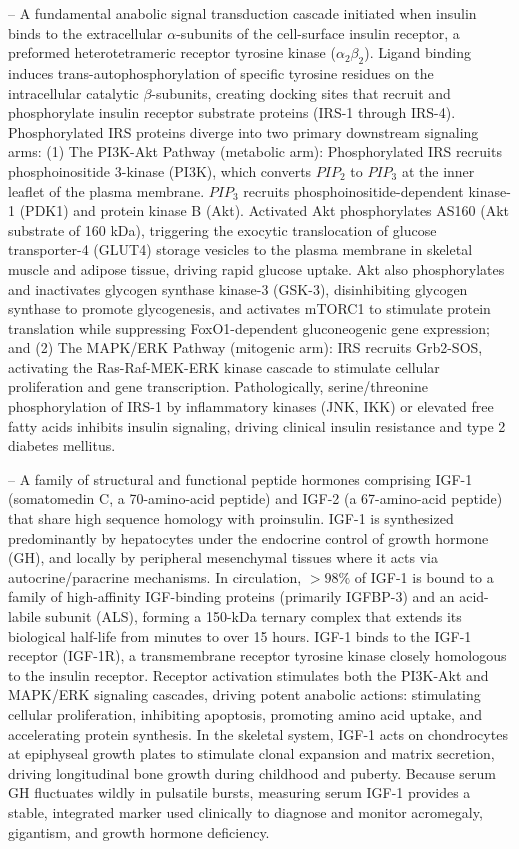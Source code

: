 -- A fundamental anabolic signal transduction cascade initiated when insulin binds to the extracellular $\alpha$-subunits of the cell-surface insulin receptor, a preformed heterotetrameric receptor tyrosine kinase ($\alpha_2\beta_2$). Ligand binding induces trans-autophosphorylation of specific tyrosine residues on the intracellular catalytic $\beta$-subunits, creating docking sites that recruit and phosphorylate insulin receptor substrate proteins (IRS-1 through IRS-4). Phosphorylated IRS proteins diverge into two primary downstream signaling arms: (1) The PI3K-Akt Pathway (metabolic arm): Phosphorylated IRS recruits phosphoinositide 3-kinase (PI3K), which converts $PIP_2$ to $PIP_3$ at the inner leaflet of the plasma membrane. $PIP_3$ recruits phosphoinositide-dependent kinase-1 (PDK1) and protein kinase B (Akt). Activated Akt phosphorylates AS160 (Akt substrate of 160 kDa), triggering the exocytic translocation of glucose transporter-4 (GLUT4) storage vesicles to the plasma membrane in skeletal muscle and adipose tissue, driving rapid glucose uptake. Akt also phosphorylates and inactivates glycogen synthase kinase-3 (GSK-3), disinhibiting glycogen synthase to promote glycogenesis, and activates mTORC1 to stimulate protein translation while suppressing FoxO1-dependent gluconeogenic gene expression; and (2) The MAPK/ERK Pathway (mitogenic arm): IRS recruits Grb2-SOS, activating the Ras-Raf-MEK-ERK kinase cascade to stimulate cellular proliferation and gene transcription. Pathologically, serine/threonine phosphorylation of IRS-1 by inflammatory kinases (JNK, IKK) or elevated free fatty acids inhibits insulin signaling, driving clinical insulin resistance and type 2 diabetes mellitus.

-- A family of structural and functional peptide hormones comprising IGF-1 (somatomedin C, a 70-amino-acid peptide) and IGF-2 (a 67-amino-acid peptide) that share high sequence homology with proinsulin. IGF-1 is synthesized predominantly by hepatocytes under the endocrine control of growth hormone (GH), and locally by peripheral mesenchymal tissues where it acts via autocrine/paracrine mechanisms. In circulation, $>98\%$ of IGF-1 is bound to a family of high-affinity IGF-binding proteins (primarily IGFBP-3) and an acid-labile subunit (ALS), forming a 150-kDa ternary complex that extends its biological half-life from minutes to over 15 hours. IGF-1 binds to the IGF-1 receptor (IGF-1R), a transmembrane receptor tyrosine kinase closely homologous to the insulin receptor. Receptor activation stimulates both the PI3K-Akt and MAPK/ERK signaling cascades, driving potent anabolic actions: stimulating cellular proliferation, inhibiting apoptosis, promoting amino acid uptake, and accelerating protein synthesis. In the skeletal system, IGF-1 acts on chondrocytes at epiphyseal growth plates to stimulate clonal expansion and matrix secretion, driving longitudinal bone growth during childhood and puberty. Because serum GH fluctuates wildly in pulsatile bursts, measuring serum IGF-1 provides a stable, integrated marker used clinically to diagnose and monitor acromegaly, gigantism, and growth hormone deficiency.

